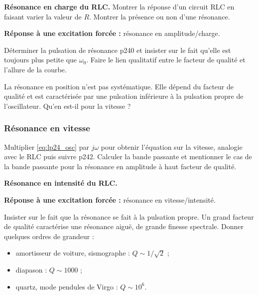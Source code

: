 \begin{experience}
\textbf{Résonance en charge du RLC.}
Montrer la réponse d'un circuit RLC en faisant varier la valeur de $R$. Montrer la présence ou non d'une résonance.
\end{experience}

\begin{slide}
\textbf{Réponse à une excitation forcée :} résonance en amplitude/charge.
\end{slide}

Déterminer la pulsation de résonance \cite{Michel2017} p240 et insister sur le fait qu'elle est toujours plus petite que $\omega_0$.
Faire le lien qualitatif entre le facteur de qualité et l'allure de la courbe.

\begin{transition}
La résonance en position n'est pas systématique.
Elle dépend du facteur de qualité et est caractérisée par une pulsation inférieure à la pulsation propre de l'oscillateur.
Qu'en est-il pour la vitesse ?
\end{transition}

\subsubsection{Résonance en vitesse}

Multiplier \eqref{eq:lp24_osc} par $j\omega$ pour obtenir l'équation sur la vitesse, analogie avec le RLC puis suivre \cite{Michel2017} p242.
Calculer la bande passante et mentionner le cas de la bande passante pour la résonance en amplitude à haut facteur de qualité.

\begin{experience}
\textbf{Résonance en intensité du RLC.}
\end{experience}

\begin{slide}
\textbf{Réponse à une excitation forcée :} résonance en vitesse/intensité.
\end{slide}

Insister sur le fait que la résonance se fait à la pulsation propre.
Un grand facteur de qualité caractérise une résonance aiguë, de grande finesse spectrale.
Donner quelques ordres de grandeur :
\begin{itemize}
\item amortisseur de voiture, sismographe : $Q \sim 1/\sqrt{2}$ ;
\item diapason : $Q \sim 1000$ ;
\item quartz, mode pendules de Virgo : $Q \sim 10^6$.
\end{itemize}

